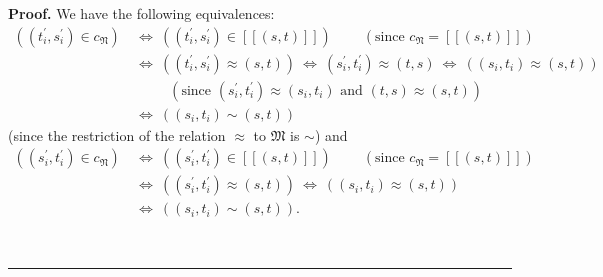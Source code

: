 \documentclass
[numbers=enddot,12pt,final,onecolumn,notitlepage,abstracton]{scrartcl}%
\theoremstyle{definition}
\newenvironment{proof}[1][Proof]{\noindent\textbf{#1.} }{\ \rule{0.5em}{0.5em}}
\begin{document}
\begin{proof}
We have the following equivalences:%
\begin{align}
\left(  \left(  t_{i}^{\prime},s_{i}^{\prime}\right)  \in c_{\mathfrak{N}%
}\right)  \  &  \Longleftrightarrow\ \left(  \left(  t_{i}^{\prime}%
,s_{i}^{\prime}\right)  \in\left[  \left[  \left(  s,t\right)  \right]
\right]  \right)  \ \ \ \ \ \ \ \ \ \ \left(  \text{since }c_{\mathfrak{N}%
}=\left[  \left[  \left(  s,t\right)  \right]  \right]  \right) \nonumber\\
&  \Longleftrightarrow\ \left(  \left(  t_{i}^{\prime},s_{i}^{\prime}\right)
\approx\left(  s,t\right)  \right)  \ \Longleftrightarrow\ \left(
s_{i}^{\prime},t_{i}^{\prime}\right)  \approx\left(  t,s\right)
\ \Longleftrightarrow\ \left(  \left(  s_{i},t_{i}\right)  \approx\left(
s,t\right)  \right) \nonumber\\
&  \ \ \ \ \ \ \ \ \ \ \ \left(  \text{since }\left(  s_{i}^{\prime}%
,t_{i}^{\prime}\right)  \approx\left(  s_{i},t_{i}\right)  \text{ and }\left(
t,s\right)  \approx\left(  s,t\right)  \right) \nonumber\\
&  \Longleftrightarrow\ \left(  \left(  s_{i},t_{i}\right)  \sim\left(
s,t\right)  \right)  \label{pf.thm.BCL.b.hasdiff1.pf.equiv1}%
\end{align}
(since the restriction of the relation $\approx$ to $\mathfrak{M}$ is $\sim$)
and%
\begin{align}
\left(  \left(  s_{i}^{\prime},t_{i}^{\prime}\right)  \in c_{\mathfrak{N}%
}\right)  \  &  \Longleftrightarrow\ \left(  \left(  s_{i}^{\prime}%
,t_{i}^{\prime}\right)  \in\left[  \left[  \left(  s,t\right)  \right]
\right]  \right)  \ \ \ \ \ \ \ \ \ \ \left(  \text{since }c_{\mathfrak{N}%
}=\left[  \left[  \left(  s,t\right)  \right]  \right]  \right) \nonumber\\
&  \Longleftrightarrow\ \left(  \left(  s_{i}^{\prime},t_{i}^{\prime}\right)
\approx\left(  s,t\right)  \right)  \ \Longleftrightarrow\ \left(  \left(
s_{i},t_{i}\right)  \approx\left(  s,t\right)  \right) \nonumber\\
&  \Longleftrightarrow\ \left(  \left(  s_{i},t_{i}\right)  \sim\left(
s,t\right)  \right)  . \label{pf.thm.BCL.b.hasdiff1.pf.equiv2}%
\end{align}



\end{proof}
\end{document}
